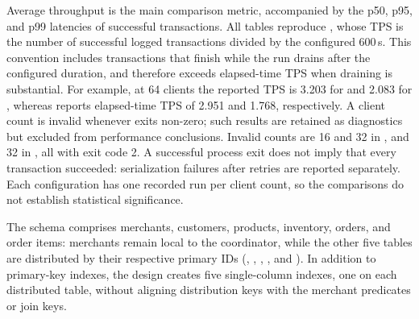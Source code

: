 Average throughput is the main comparison metric, accompanied by the
p50, p95, and p99 latencies of successful transactions.
All tables reproduce , whose TPS is the number of
successful logged transactions divided by the configured 600\,s.
This convention includes transactions that finish while the run drains
after the configured duration, and therefore exceeds elapsed-time TPS
when draining is substantial. For example, at 64 clients the reported
TPS is 3.203 for  and 2.083 for , whereas
 reports elapsed-time TPS of 2.951 and 1.768, respectively.
A client count is invalid whenever  exits non-zero;
such results are retained as diagnostics but excluded from performance
conclusions. Invalid counts are 16 and 32 in , and 32 in
, all with exit code 2.
A successful process exit does not imply that every transaction succeeded:
serialization failures after retries are reported separately.
Each configuration has one recorded run per client count, so the
comparisons do not establish statistical significance.


The schema comprises merchants, customers, products, inventory, orders,
and order items: merchants remain local to the coordinator, while the
other five tables are distributed by their respective primary IDs
(, , ,
, and ).
In addition to primary-key indexes, the design creates five single-column
 indexes, one on each distributed table, without
aligning distribution keys with the merchant predicates or join keys.


